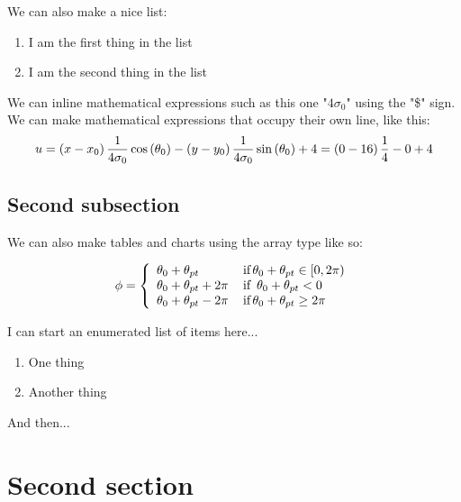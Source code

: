 \documentclass[a4paper,12pt]{article} %
\begin{document}
\noindent
We can also make a nice list:

\vspace{2mm}
\begin{enumerate}
\item I am the first thing in the list
\item I am the second thing in the list
\end{enumerate}
\vspace{2mm}

\noindent
We can inline mathematical expressions such as this one "$4 \sigma_0$" using the "\$" sign. We can make mathematical expressions that occupy their own line, like this: 
\[
u = \left(x - x_0\right) {1 \over 4 \sigma_0} \cos\left(\theta_0\right) - \left(y - y_0\right) {1 \over 4 \sigma_0} \sin\left(\theta_0\right) + 4 = \left(0 - 16\right) \frac{1}{4} - 0 + 4
\]

\subsection{Second subsection}

We can also make tables and charts using the array type like so:

\vspace{2mm}
\[ \phi = \left\{ 
\begin{array}{l l}
\theta_0 + \theta_{pt} & \, \textrm{if} \, \theta_0 + \theta_{pt} \in [0,2 \pi)\\ 
\theta_0 + \theta_{pt} + 2 \pi & \, \textrm{if} \, \ \theta_0 + \theta_{pt} < 0\\
\theta_0 + \theta_{pt} - 2 \pi & \, \textrm{if} \, \theta_0 + \theta_{pt} \ge 2 \pi\\
\end{array} \right.
\] 
\vspace{2mm}

\noindent
I can start an enumerated list of items here...

\vspace{5mm}
\begin{enumerate}
\item One thing
\item Another thing
\end{enumerate}
\vspace{5mm}

\noindent
And then...

\section{Second section}
\end{document}
